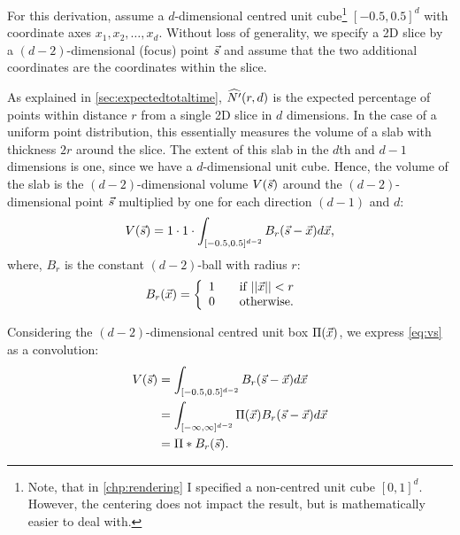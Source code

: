 

For this derivation, assume a $d$-dimensional centred unit
cube\footnote{Note, that in \autoref{chp:rendering} I specified a
non-centred unit cube $[0, 1]^d$. However, the centering does not impact the
result, but is mathematically easier to deal with.} $[-0.5, 0.5]^d$ with
coordinate axes $x_1, x_2, \ldots, x_d$. Without loss of generality, we
specify a 2D slice by a $(d-2)$-dimensional (focus) point $\vec{s}$ and 
assume that the two additional coordinates are the coordinates within the
slice.

As explained in \autoref{sec:expectedtotaltime}, $\widehat{N'}(r, d)$ is the expected
percentage of points within distance $r$ from a single 2D slice in $d$
dimensions. In the case of a uniform point distribution, this essentially
measures the volume of a slab with thickness $2r$ around the slice. The extent
of this slab in the $d$th and $d-1$ dimensions is one, since we have a
$d$-dimensional unit cube. Hence, the volume of the slab is the
$(d-2)$-dimensional volume $V(\vec{s})$ around the $(d-2)$-dimensional point $\vec{s}$
multiplied by one for each direction $(d-1)$ and $d$:
\begin{equation}
  V(\vec{s}) = 1 \cdot 1 \cdot \int_{[-0.5,0.5]^{d-2}} B_r(\vec{s}-\vec{x}) d\vec{x} \text{,}
   \label{eq:vs}
\end{equation}
where, $B_r$ is the constant $(d-2)$-ball with radius $r$:
\begin{align*}
  B_r(\vec{x}) &= \left\{ 
  \begin{array}{l l}
    1 & \quad \text{if $||\vec{x}||<r$}\\
    0 & \quad \text{otherwise} \text{.}\\
  \end{array} \right. 
\end{align*}


Considering the $(d-2)$-dimensional centred unit box $\Pi(\vec{x})$, we express \autoref{eq:vs} as a convolution:
\begin{align*}
  V(\vec{s}) &= \int_{[-0.5,0.5]^{d-2}} B_r(\vec{s}-\vec{x}) d\vec{x}\\
          &= \int_{[-\infty,\infty]^{d-2}} \Pi(\vec{x}) B_r(\vec{s}-\vec{x}) d\vec{x} \\
          &= \Pi * B_r(\vec{s}) \text{.}
\end{align*}

